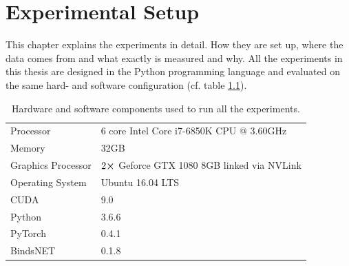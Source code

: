 \chapter{Experimental Setup}\label{chapter:experimental-setup}
This chapter explains the experiments in detail. How they are set up, where the data comes from and what exactly is measured and why. All the experiments in this thesis are designed in the Python programming language and evaluated on the same hard- and software configuration (cf. table \ref{tab:hardware}).
\begin{table}[H]
\centering
\begin{tabular}{@{}ll@{}}
\toprule
Processor          & 6 core Intel Core i7-6850K CPU @ 3.60GHz         \\
Memory             & 32GB                                             \\
Graphics Processor & $2\cross$ Geforce GTX 1080 8GB linked via NVLink \\
Operating System   & Ubuntu 16.04 LTS                                 \\
CUDA               & 9.0                                              \\
Python             & 3.6.6                                            \\
PyTorch            & 0.4.1                                            \\
BindsNET           & 0.1.8                                            \\ \bottomrule
\end{tabular}
\caption[Hardware and Software Components]{Hardware and software components used to run all the experiments.}
\label{tab:hardware}
\end{table}

